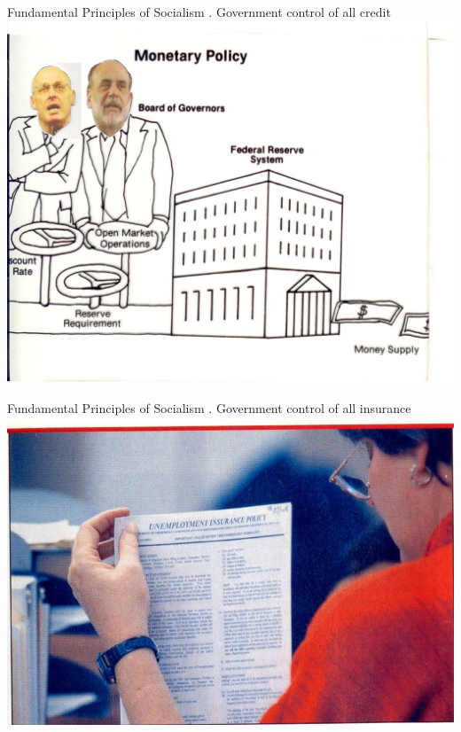 \begin{frame}[t]{Fundamental Principles of Socialism}
    . Government control of all credit \\
    \includegraphics[width=.9\textwidth]{img/credit.png} \\
\end{frame}

\begin{frame}[t]{Fundamental Principles of Socialism}
    . Government control of all insurance \\
    \includegraphics[width=.9\textwidth]{img/insurance.jpg} \\
\end{frame}

